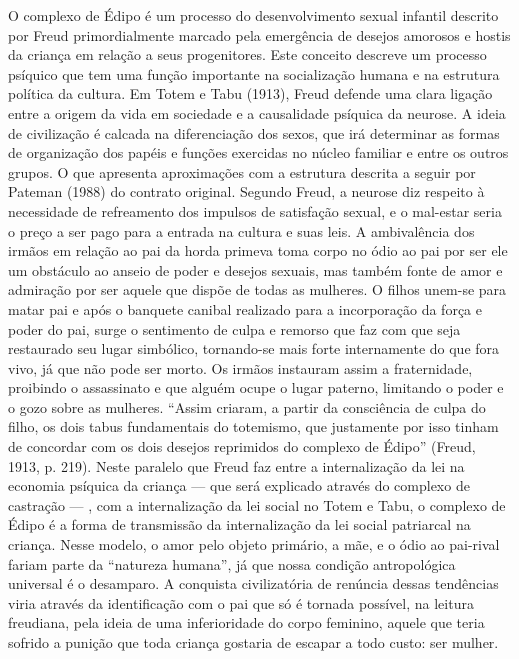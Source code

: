 O complexo de Édipo é um processo do desenvolvimento sexual infantil
descrito por Freud primordialmente marcado pela emergência de desejos
amorosos e hostis da criança em relação a seus progenitores. Este
conceito descreve um processo psíquico que tem uma função importante na
socialização humana e na estrutura política da cultura. Em Totem e Tabu
(1913), Freud defende uma clara ligação entre a origem da vida em
sociedade e a causalidade psíquica da neurose. A ideia de civilização é
calcada na diferenciação dos sexos, que irá determinar as formas de
organização dos papéis e funções exercidas no núcleo familiar e entre os
outros grupos. O que apresenta aproximações com a estrutura descrita a
seguir por Pateman (1988) do contrato original. Segundo Freud, a neurose
diz respeito à necessidade de refreamento dos impulsos de satisfação
sexual, e o mal-estar seria o preço a ser pago para a entrada na cultura
e suas leis. A ambivalência dos irmãos em relação ao pai da horda
primeva toma corpo no ódio ao pai por ser ele um obstáculo ao anseio de
poder e desejos sexuais, mas também fonte de amor e admiração por ser
aquele que dispõe de todas as mulheres. O filhos unem-se para matar pai
e após o banquete canibal realizado para a incorporação da força e poder
do pai, surge o sentimento de culpa e remorso que faz com que seja
restaurado seu lugar simbólico, tornando-se mais forte internamente do
que fora vivo, já que não pode ser morto. Os irmãos instauram assim a
fraternidade, proibindo o assassinato e que alguém ocupe o lugar
paterno, limitando o poder e o gozo sobre as mulheres. ``Assim criaram,
a partir da consciência de culpa do filho, os dois tabus fundamentais do
totemismo, que justamente por isso tinham de concordar com os dois
desejos reprimidos do complexo de Édipo'' (Freud, 1913, p. 219). Neste
paralelo que Freud faz entre a internalização da lei na economia
psíquica da criança --- que será explicado através do complexo de
castração --- , com a internalização da lei social no Totem e Tabu, o
complexo de Édipo é a forma de transmissão da internalização da lei
social patriarcal na criança. Nesse modelo, o amor pelo objeto primário,
a mãe, e o ódio ao pai-rival fariam parte da ``natureza humana'', já que
nossa condição antropológica universal é o desamparo. A conquista
civilizatória de renúncia dessas tendências viria através da
identificação com o pai que só é tornada possível, na leitura freudiana,
pela ideia de uma inferioridade do corpo feminino, aquele que teria
sofrido a punição que toda criança gostaria de escapar a todo custo: ser
mulher.


